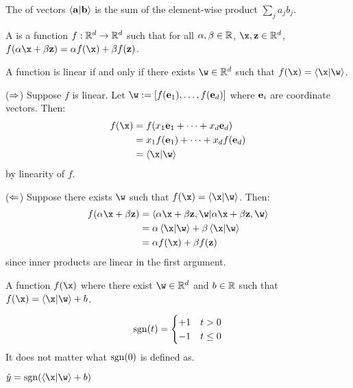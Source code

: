 \documentclass[class=cs480,notes,tikz]{agony}
\begin{document}
\begin{defn}
  The  of vectors $\ip{\vb a}{\vb b}$
  is the sum of the element-wise product $\sum_j a_j b_j$.

  A  is a function $f : \mathbb{R}^d \to \mathbb{R}^d$
  such that for all $\alpha,\beta \in \mathbb{R}$, $\x, \vb z \in \R^d$,
  $f(\alpha\x + \beta\vb z) = \alpha f(\x) + \beta f(\vb z)$.
\end{defn}
\begin{theorem}
  A function is linear if and only if there exists $\w \in \R^d$
  such that $f(\x) = \ip{\x}{\w}$.
\end{theorem}
\begin{prf}
  ($\Rightarrow$) Suppose $f$ is linear.
  Let $\w := [f(\vb e_1), \dotsc, f(\vb e_d)]$
  where $\vb e_i$ are coordinate vectors. Then:
  \begin{align*}
    f(\x) & = f(x_1\vb e_1 + \dotsb + x_d \vb e_d)     \\
          & = x_1 f(\vb e_1) + \dotsb + x_d f(\vb e_d) \\
          & = \ip{\x}{\w}
  \end{align*}
  by linearity of $f$.

  ($\Leftarrow$) Suppose there exists $\w$ such that $f(\x) = \ip{\x}{\w}$.
  Then: \begin{align*}
    f(\alpha\x + \beta\vb z)
     & = \ip{\alpha\x+\beta\vb z,\w}          \\
     & = \alpha\ip{\x}{\w} + \beta\ip{\x}{\w} \\
     & = \alpha f(\x) + \beta f(\vb z)
  \end{align*}
  since inner products are linear in the first argument.
\end{prf}

\begin{defn}
  A function $f(\x)$ where there exist $\w \in \R^d$
  and  $b \in \mathbb{R}$ such that $f(\x) = \ip{\x}{\w} + b$.
\end{defn}

\begin{defn}
  \[
    \operatorname{sgn}(t) = \begin{cases}
      +1 & t > 0    \\
      -1 & t \leq 0
    \end{cases}
  \]
  It does not matter what $\operatorname{sgn}(0)$ is defined as.
\end{defn}

\begin{defn}
  $\hat y = \sgn(\ip{\x}{\w} + b)$
\end{defn}
\end{document}
